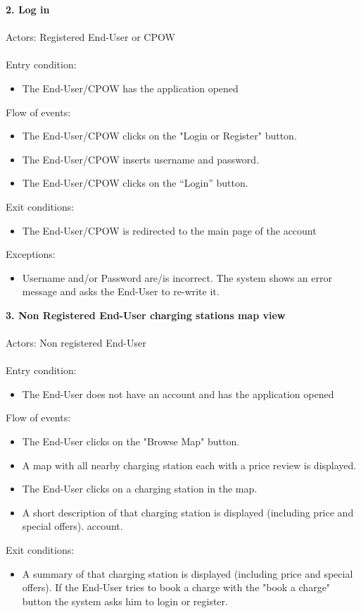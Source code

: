\documentclass[a4paper]{report}
\begin{document}
\textbf{2. Log in}\label{uc:1}
\\
\\
Actors: Registered End-User or CPOW\\ \\
Entry condition:
\begin{itemize}
\item The End-User/CPOW has the application opened
\end{itemize}
Flow of events:
\begin{itemize}
\item The End-User/CPOW clicks on the "Login or Register" button.
\item The End-User/CPOW inserts username and password.
\item The End-User/CPOW clicks on the “Login” button.
\end{itemize}
Exit conditions:
\begin{itemize}
\item The End-User/CPOW is redirected to the main page of the account
\end{itemize}
Exceptions:
\begin{itemize}
\item Username and/or Password are/is incorrect. The system shows an error message and asks the End-User to re-write it.
\end{itemize}
\textbf{3. Non Registered End-User charging stations map view}\label{uc:1}
\\
\\
Actors: Non registered End-User\\ \\
Entry condition:
\begin{itemize}
\item The End-User does not have an account and has the application opened
\end{itemize}
Flow of events:
\begin{itemize}
\item The End-User clicks on the "Browse Map" button.
\item A map with all nearby charging station each with a price review is displayed.
\item The End-User clicks on a charging station in the map.
\item A short description of that charging station is displayed (including price and special offers).
 account.
\end{itemize}
Exit conditions:
\begin{itemize}
\item A summary of that charging station is displayed (including price and special offers). If the End-User tries to book a charge with the "book a charge" button the system asks him to login or register.
\end{itemize}
\end{document}
